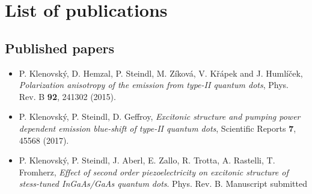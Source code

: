 \documentclass[
a4paper, %
11pt, %
onecolumn, %
openany, %
oldfontcommands,
]{memoir}
\begin{document}
%
%
%

%




%
\chapter{List of publications}\label{chap:publications}

\section*{Published papers}
\begin{itemize}
	\item P. Klenovský, D. Hemzal, P. Steindl, M. Zíková, V. Křápek and J. Humlíček, \textit{Polarization anisotropy of the emission from type-II quantum dots}, Phys. Rev. B \textbf{92}, 241302 (2015).
	
	\item P. Klenovský, P. Steindl, D. Geffroy, \textit{Excitonic structure and pumping power dependent emission blue-shift of type-II quantum dots}, Scientific Reports \textbf{7}, 45568 (2017).
	
	\item P. Klenovský, P. Steindl, J. Aberl, E. Zallo, R. Trotta, A. Rastelli, T. Fromherz, \textit{Effect of second order piezoelectricity on excitonic structure of stess-tuned InGaAs/GaAs quantum dots}. Phys. Rev. B. Manuscript submitted
\end{itemize}
\end{document}
